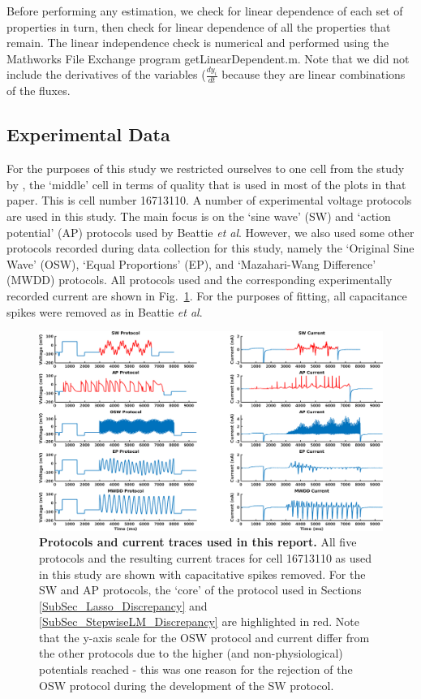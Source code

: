 \documentclass[11pt,a4paper,oneside]{article}
\begin{document}
Before performing any estimation, we check for linear dependence of each set of properties in turn, then check for linear dependence of all the properties that remain. The linear independence check is numerical and performed using the Mathworks File Exchange program getLinearDependent.m. Note that we did not include the derivatives of the variables ($\frac{dy_i}{dt}$ because they are linear combinations of the fluxes.

\subsection{Experimental Data}
For the purposes of this study we restricted ourselves to one cell from the study by \cite{}, the `middle' cell in terms of quality that is used in most of the plots in that paper. This is cell number 16713110. A number of experimental voltage protocols are used in this study. The main focus is on the `sine wave' (SW) and `action potential' (AP) protocols used by Beattie \textit{et al}\cite{Beattie2018}. However, we also used some other protocols recorded during data collection for this study, namely the `Original Sine Wave' (OSW), `Equal Proportions' (EP), and `Mazahari-Wang Difference' (MWDD) protocols. All protocols used and the corresponding experimentally recorded current are shown in Fig.~\ref{Fig_Protocols}. For the purposes of fitting, all capacitance spikes were removed as in Beattie \textit{et al}\cite{Beattie2018}.

\begin{figure}[t]
\begin{center}
\includegraphics[scale=0.42]{Figures/Protocols.png}
\caption{\textbf{Protocols and current traces used in this report.} All five protocols and the resulting current traces for cell 16713110 as used in this study are shown with capacitative spikes removed. For the SW and AP protocols, the `core' of the protocol used in Sections \ref{SubSec_Lasso_Discrepancy} and \ref{SubSec_StepwiseLM_Discrepancy} are highlighted in red. Note that the y-axis scale for the OSW protocol and current differ from the other protocols due to the higher (and non-physiological) potentials reached - this was one reason for the rejection of the OSW protocol during the development of the SW protocol.}
\label{Fig_Protocols}
\end{center}
\end{figure}
\end{document}

